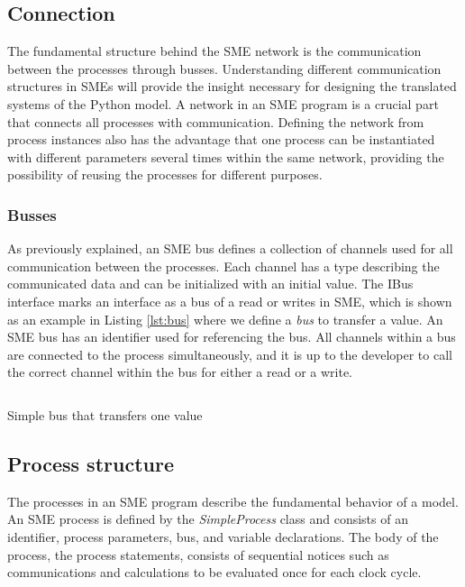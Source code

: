 \subsection{Connection}

The fundamental structure behind the SME network is the communication between the processes through busses. Understanding different communication structures in SMEs will provide the insight necessary for designing the translated systems of the Python model.
A network in an SME program is a crucial part that connects all processes with
communication. Defining the network from process instances
also has the advantage that one process can be instantiated with different parameters several
times within the same network, providing the possibility of reusing the processes for different
purposes.

\subsubsection{Busses}
As previously explained, an SME bus defines a collection of channels used for all
communication between the processes. Each channel has a type describing the communicated
data and can be initialized with an initial value. The IBus interface marks an interface as a bus of a read or writes in SME, which is shown as an example in Listing \ref{lst:bus} where we define a \emph{bus} to transfer a value. 
An SME bus has an identifier used for referencing the bus. All channels within a bus are connected to the process simultaneously, and it is up to the developer to call the correct channel within the bus for either a read or a write. 

\begin{listing}
  \inputminted{csharp}{codesnippets/bus_value.cs}
  \caption{Simple bus that transfers one value}
  \label{lst:bus}
\end{listing}

\subsection{Process structure}
The processes in an SME program describe the fundamental behavior of a model.
An SME process is defined by the \emph{SimpleProcess} class and consists of an identifier, process parameters, bus, and variable declarations. The body of the process, the process statements, consists
of sequential notices such as communications and calculations to be evaluated once
for each clock cycle. 

